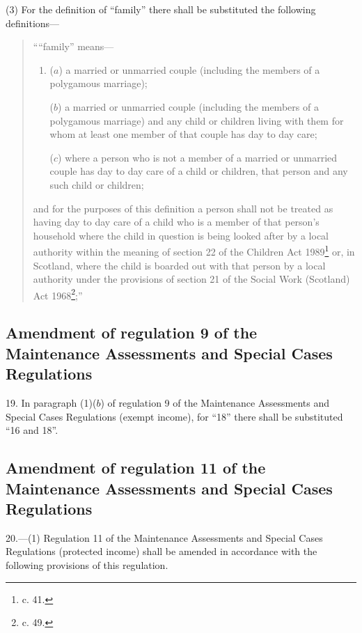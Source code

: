 \documentclass[12pt,a4paper]{article}
\begin{document}
(3) For the definition of “family” there shall be substituted the following definitions—
\begin{quotation}
““family” means—
\begin{enumerate}\item[]
($a$) a married or unmarried couple (including the members of a polygamous marriage);

($b$) a married or unmarried couple (including the members of a polygamous marriage) and any child or children living with them for whom at least one member of that couple has day to day care;

($c$) where a person who is not a member of a married or unmarried couple has day to day care of a child or children, that person and any such child or children;
\end{enumerate}
and for the purposes of this definition a person shall not be treated as having day to day care of a child who is a member of that person’s household where the child in question is being looked after by a local authority within the meaning of section 22 of the Children Act 1989\footnote{ c. 41.} or, in Scotland, where the child is boarded out with that person by a local authority under the provisions of section 21 of the Social Work (Scotland) Act 1968\footnote{ c. 49.};”
\end{quotation}

\subsection[19. Amendment of regulation 9 of the Maintenance Assessments and Special Cases Regulations]{\sloppy Amendment of regulation 9 of the Maintenance Assessments and Special Cases Regulations}

19.  In paragraph (1)($b$) of regulation 9 of the Maintenance Assessments and Special Cases Regulations (exempt income), for “18” there shall be substituted “16 and 18”.

\subsection[20. Amendment of regulation 11 of the Maintenance Assessments and Special Cases Regulations]{Amendment of regulation 11 of the Maintenance Assessments and Special Cases Regulations}

20.—(1) Regulation 11 of the Maintenance Assessments and Special Cases Regulations (protected income) shall be amended in accordance with the following provisions of this regulation.
\end{document}
